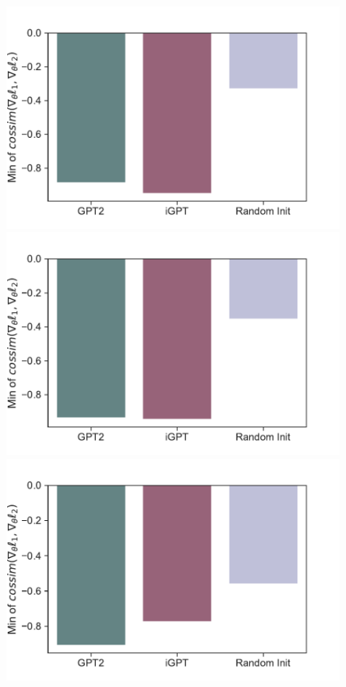 \documentclass{article}
\begin{document}
\begin{figure}[H]
    \centering
    \begin{minipage}[b]{0.32\linewidth}
        \includegraphics[width=\linewidth]{figs/mingradcossim_1_gpt2_igpt_dt_hopper_medium_42.pdf}
    \end{minipage}
    \begin{minipage}[b]{0.32\linewidth}
        \includegraphics[width=\linewidth]{figs/mingradcossim_1_gpt2_igpt_dt_halfcheetah_medium_42.pdf}
    \end{minipage}
    \begin{minipage}[b]{0.32\linewidth}
        \includegraphics[width=\linewidth]{figs/mingradcossim_1_gpt2_igpt_dt_walker2d_medium_42.pdf}

\end{minipage}
\end{figure}
\end{document}
